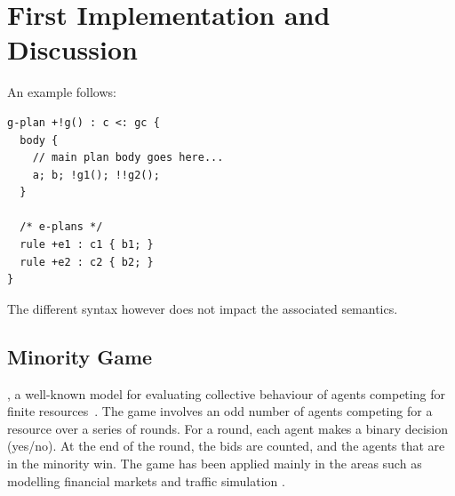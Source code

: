 \section{First  Implementation and  Discussion}
\label{sec:evaluation}

%
An example follows:

{\small
\begin{verbatim}
g-plan +!g() : c <: gc { 
  body {
    // main plan body goes here...
    a; b; !g1(); !!g2();
  }

  /* e-plans */
  rule +e1 : c1 { b1; }
  rule +e2 : c2 { b2; }
}
\end{verbatim}}
%
\noindent The different syntax however does not impact the associated semantics.

\subsection{Minority Game}
\label{minority}

, a well-known model for evaluating collective 
behaviour of agents competing  for finite resources~\cite{moro2004minority}. The game involves an odd number of
agents competing for a resource over a series of rounds. For a round, each agent makes a binary
decision (yes/no). At the end of the round, the bids are counted, and the agents that are in the
minority win. The game has been applied mainly in the areas such as modelling financial markets 
\cite{challet2013minority} and traffic simulation \cite{chmura2004minority}.

